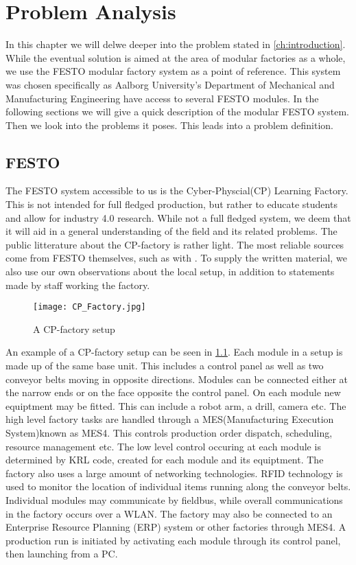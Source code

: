 \chapter{Problem Analysis}\label{ch:problemanalysis}
In this chapter we will delwe deeper into the problem stated in \cref{ch:introduction}. While the eventual solution is aimed at the area of modular factories as a whole, we use the FESTO modular factory system \cite{FESTOweb} as a point of reference. This system was chosen specifically as Aalborg University's Department of Mechanical and Manufacturing Engineering have access to several FESTO modules. In the following sections we will give a quick description of the modular FESTO system. Then we look into the problems it poses. This leads into a problem definition.  

\section{FESTO}
The FESTO system accessible to us is the Cyber-Physcial(CP) Learning Factory. This is not intended for full fledged production, but rather to educate students and allow for industry 4.0 research. While not a full fledged system, we deem that it will aid in a general understanding of the field and its related problems. The public litterature about the CP-factory is rather light. The most reliable sources come from FESTO themselves, such as with \cite{CPFactory2015}. To supply the written material, we also use our own observations about the local setup, in addition to statements made by staff working the factory.  

\begin{figure}[h]
\centering
\texttt{[image: CP\_Factory.jpg]}
\caption{A CP-factory setup}
\label{fig:festo-example}
\end{figure}

An example of a CP-factory setup can be seen in \cref{fig:festo-example}. Each module in a setup is made up of the same base unit. This includes a control panel as well as two conveyor belts moving in opposite directions. Modules can be connected either at the narrow ends or on the face opposite the control panel. On each module new equiptment may be fitted. This can include a robot arm, a drill, camera etc. The high level factory tasks are handled through a MES(Manufacturing Execution System)known as MES4. This controls production order dispatch, scheduling, resource management etc. The low level control occuring at each module is determined by KRL code, created for each module and its equiptment. The factory also uses a large amount of networking technologies. RFID technology is used to monitor the location of individual items running along the conveyor belts. Individual modules may communicate by fieldbus, while overall communications in the factory occurs over a WLAN. The factory may also be connected to an Enterprise Resource Planning (ERP) system or other factories through MES4. A production run is initiated by activating each module through its control panel, then launching from a PC.

